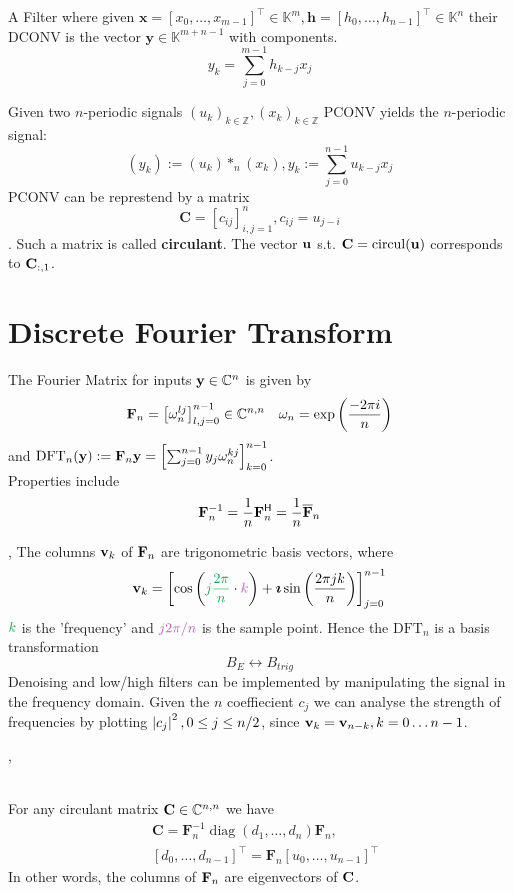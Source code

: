  A Filter where given $\mathbf{x}=\left[x_{0}, \ldots, x_{m-1}\right]^{\top} \in \mathbb{K}^{m}, \mathbf{h}=\left[h_{0}, \ldots, h_{n-1}\right]^{\top} \in \mathbb{K}^{n}$ their DCONV is the vector $\mathbf{y} \in \mathbb{K}^{m+n-1}$ with components.
$$y_{k}=\sum_{j=0}^{m-1} h_{k-j} x_{j}$$

 Given two $n$-periodic signals $\left(u_{k}\right)_{k \in \mathbb{Z}},\left(x_{k}\right)_{k \in \mathbb{Z}}$ PCONV yields the $n$-periodic signal:
$$\left(y_{k}\right):=\left(u_{k}\right) *_{n}\left(x_{k}\right), y_{k}:=\sum_{j=0}^{n-1} u_{k-j} x_{j}$$
PCONV can be represtend by a matrix $$\mathbf{C}=\left[c_{i j}\right]_{i, j=1}^{n}, c_{i j} = u_{j-i}$$. Such a matrix is called \textbf{circulant}. The vector $\mathbf{u}$ s.t. $\mathbf{C} = \operatorname{circul}(\mathbf{u})$ corresponds to $\mathbf{C}_{:,1}$.

\section{Discrete Fourier Transform}
The Fourier Matrix for inputs $\mathbf{y} \in \mathbb{C}^{n}$ is given by
$$ \mathbf{F}_n = \left[\omega_{n}^{l j}\right]_{l, j=0}^{n-1} \in \mathbb{C}^{n, n} \quad \omega_{n} = \exp\left(\frac{-2\pi i}{n}\right)$$
and $\mathrm{DFT}_{n}(\mathbf{y}):=\mathbf{F}_{n} \mathbf{y} = \left[\sum_{j=0}^{n-1} y_{j} \omega_{n}^{k j}\right]_{k=0}^{n-1}$. \\ Properties include
$$\mathbf{F}_{n}^{-1}=\frac{1}{n} \mathbf{F}_{n}^{\mathsf{H}}=\frac{1}{n} \overline{\mathbf{F}}_{n}$$

\sep
{}
The columns $\mathbf{v}_k$ of $\mathbf{F}_n$ are trigonometric basis vectors, where 
$$\vv_k = \left[\cos \left(\tcg{j\frac{2 \pi}{n}}\cdot \tcp{k}\right)+\boldsymbol{\imath} \sin \left(\frac{2 \pi j k}{n}\right)\right]_{j=0}^{n-1}$$
$\tcg{k}$ is the 'frequency' and $\tcp{j2\pi/n}$ is  the sample point.
Hence the $\mathrm{DFT}_{n}$ is a basis transformation $$B_E \leftrightarrow B_{trig}$$
Denoising and low/high filters can be implemented by manipulating the signal in the frequency domain.
Given the $n$ coeffiecient $c_j$ we can analyse the strength of frequencies by plotting $\left\lvert c_j \right\rvert^2, 0\leq j\leq n/2$, since $\mathbf{v}_k = \mathbf{v}_{n-k}, k=0\dots n-1$.

\sep

 \\
For any circulant matrix $\mathbf{C} \in \mathbb{C}^{n,n}$ we have 
\begin{align*}
&\mathbf{C}=\mathbf{F}_{n}^{-1} \operatorname{diag}\left(d_{1}, \ldots, d_{n}\right) \mathbf{F}_{n}, \\ 
&\left[d_{0}, \ldots, d_{n-1}\right]^{\top}=\mathbf{F}_{n}\left[u_{0}, \ldots, u_{n-1}\right]^{\top}
\end{align*}
In other words, the columns of $\mathbf{F}_n$ are eigenvectors of $\mathbf{C}$. \\

